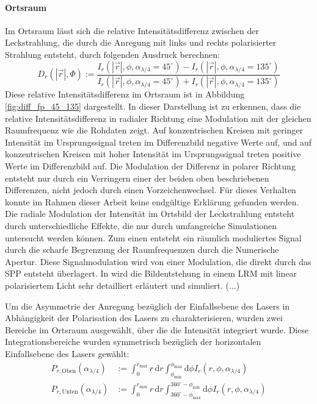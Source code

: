 \documentclass[titlepage,  ngerman]{article}
\begin{document}
		\paragraph{Ortsraum}
		Im Ortsraum lässt sich die relative Intensitätsdifferenz zwischen der Leckstrahlung, die durch die Anregung mit links und rechts polarisierter Strahlung entsteht, durch folgenden Ausdruck berechnen:
		\begin{equation}
		 	\label{eq:diff_measure}
			D_r\left(|\vec{r}|, \Phi\right) := \dfrac{I_r(|\vec{r}|, \phi, \alpha_{\lambda /4} = 45^\circ) - I_r(|\vec{r}|, \phi, \alpha_{\lambda /4} = 135^\circ)}{I_r(|\vec{r}|, \phi, \alpha_{\lambda /4} = 45^\circ) + I_r(|\vec{r}|, \phi, \alpha_{\lambda /4} = 135^\circ)}
		\end{equation} 
		 Diese relative Intensitätsdifferenz im Ortsraum ist in Abbildung \ref{fig:diff_fp_45_135} dargestellt. In dieser Darstellung ist zu erkennen, dass die relative Intensitätsdifferenz in radialer Richtung eine Modulation mit der gleichen Raumfrequenz wie die Rohdaten zeigt. Auf konzentrischen Kreisen mit geringer Intensität im Ursprungssignal treten im Differenzbild negative Werte auf, und auf konzentrischen Kreisen mit hoher Intensität im Ursprungssignal treten positive Werte im Differenzbild auf. Die Modulation der Differenz in polarer Richtung entsteht nur durch ein Verringern einer der beiden oben beschriebenen Differenzen, nicht jedoch durch einen Vorzeichenwechsel. Für dieses Verhalten konnte im Rahmen dieser Arbeit keine endgültige Erklärung gefunden werden. Die radiale Modulation der Intensität im Ortsbild der Leckstrahlung entsteht durch unterschiedliche Effekte, die nur durch umfangreiche Simulationen untersucht werden können. Zum einen entsteht ein räumlich moduliertes Signal durch die scharfe Begrenzung der Raumfrequenzen durch die Numerische Apertur. Diese Signalmodulation wird von einer Modulation, die direkt durch das SPP entsteht überlagert.  In \cite{Hohenau.2011} wird die Bildentstehung in einem LRM mit linear polarisiertem Licht sehr detailliert erläutert und simuliert. (...)
		 
		 Um die Asymmetrie der Anregung bezüglich der Einfallsebene des Lasers in Abhängigkeit der Polarisation des Lasers zu charakterisieren, wurden zwei Bereiche im Ortsraum ausgewählt, über die die Intensität integriert wurde. Diese Integrationsbereiche wurden symmetrisch bezüglich der horizontalen Einfallsebene des Lasers gewählt:		 
		 \begin{align}
		 	P_{r, \mathrm{Oben}}(\alpha_{\lambda/4}) &:= \int_{0}^{r_\mathrm{max}}r \, \mathrm{d}r \int_{\phi_\mathrm{min}}^{\phi_\mathrm{max}} \mathrm{d}\phi I_r(r, \phi, \alpha_{\lambda /4}) \\
		 	\nonumber
		 	P_{r, \mathrm{Unten}}(\alpha_{\lambda/4}) &:= \int_{0}^{r_\mathrm{max}}r \, \mathrm{d}r \int_{360^\circ -\phi_\mathrm{max}}^{360^\circ - \phi_\mathrm{min}} \mathrm{d}\phi I_r(r, \phi, \alpha_{\lambda/4})		 	
		 \end{align}
	 
\end{document}
